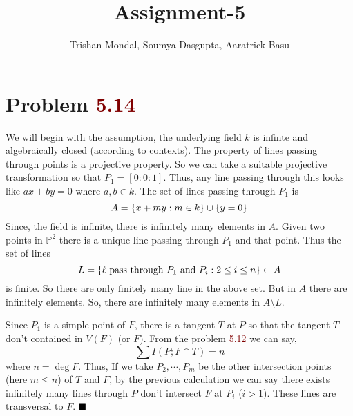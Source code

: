 \documentclass[12pt]{article}
\title{\textbf{Assignment-5}}
\author{Trishan Mondal, Soumya Dasgupta, Aaratrick Basu}
\date{}
\begin{document}
\maketitle

\section*{Problem \textcolor{maroon}{5.14}}
We will begin with the assumption, the underlying field $k$ is infinte and algebraically closed (according to contexts). The property of lines passing through points is a projective property. So we can take a suitable projective transformation so that $P_1 = [0:0:1]$. Thus, any line passing through this looks like $ax +by = 0$ where $a,b \in k$. The set of lines passing through $P_1$ is $$A = \qty{x+my : m \in k} \cup \qty{y=0}$$ Since, the field is infinite, there is infinitely many elements in $A$. Given two points in $\mathbb{P}^2$ there is a unique line passing through $P_1$ and that point. Thus the set of lines $$L=\qty{\ell \text{ pass through } P_1 \text{ and }P_{i} : 2 \leq i \leq n} \subset A$$ is finite. So there are only finitely many line in the above set. But in $A$ there are infinitely elements. So, there are infinitely many elements in $A \setminus L$.

\vspace*{0.2cm}

\noindent Since $P_1$ is a simple point of $F$, there is a tangent $T$ at $P$ so that the tangent $T$ don't contained in $V(F)$ (or $F$). From the problem \textcolor{maroon}{5.12} we can say, $$\sum I(P;F\cap T)=n$$ where $n = \deg F$. Thus, If we take $P_2,\cdots,P_m$ be the other intersection points (here $m \leq n$) of $T$ and $F$, by the previous calculation we can say there exists infinitely many lines through $P$ don't intersect $F$ at $P_i$ ($i >1$). These lines are transversal to $F$. $\hfill \blacksquare$
\end{document}
